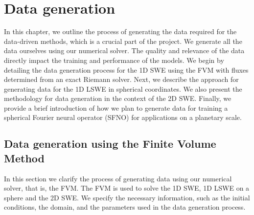 \chapter{Data generation}\label{ch:method}
In this chapter, we outline the process of generating the data required for the data-driven methods, which is a crucial part of the project.
We generate all the data ourselves using our numerical solver.
The quality and relevance of the data directly impact the training and performance of the models.
We begin by detailing the data generation process for the 1D SWE using the FVM with fluxes determined from an exact Riemann solver.
Next, we describe the approach for generating data for the 1D LSWE in spherical coordinates.
We also present the methodology for data generation in the context of the 2D SWE.
Finally, we provide a brief introduction of how we plan to generate data for training a spherical Fourier neural operator (SFNO) for applications on a planetary scale.

\section{Data generation using the Finite Volume Method}\label{sec:data_generation_fvm}
In this section we clarify the process of generating data using our numerical solver, that is, the FVM.
The FVM is used to solve the 1D SWE, 1D LSWE on a sphere and the 2D SWE.
We specify the necessary information, such as the initial conditions, the domain, and the parameters used in the data generation process.

